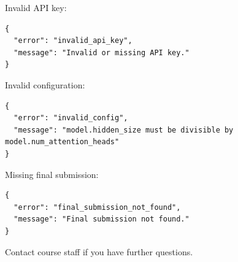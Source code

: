 \documentclass[
]{article}
\begin{document}
Invalid API key:

\begin{verbatim}
{
  "error": "invalid_api_key",
  "message": "Invalid or missing API key."
}
\end{verbatim}

Invalid configuration:

\begin{verbatim}
{
  "error": "invalid_config",
  "message": "model.hidden_size must be divisible by model.num_attention_heads"
}
\end{verbatim}

Missing final submission:

\begin{verbatim}
{
  "error": "final_submission_not_found",
  "message": "Final submission not found."
}
\end{verbatim}

Contact course staff if you have further questions.
\end{document}
